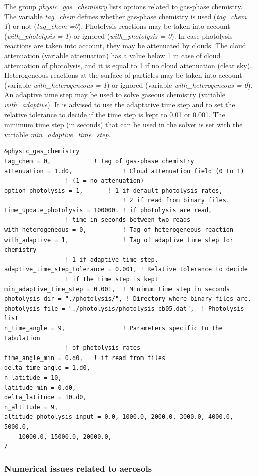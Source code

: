 \documentclass[a4paper,11pt]{article}
\begin{document}
The group {\textit{physic\_gas\_chemistry}} lists options related to gas-phase chemistry. 
The variable {\textit{tag\_chem}} defines whether gas-phase chemistry is used ({\textit{tag\_chem = 1}}) or not ({\textit{tag\_chem =0}}). 
Photolysis reactions may be taken into account ({\textit{with\_photolysis = 1}}) or ignored ({\textit{with\_photolysis = 0}}). In case photolysis reactions are taken into account, they may be attenuated by clouds. The cloud attenuation (variable attenuation) has a value below 1 in case of cloud attenuation of photolysis, and it is equal to 1 if no cloud attenuation (clear sky).
Heterogeneous reactions at the surface of particles may be taken into account (variable {\textit{with\_heterogeneous = 1}}) or ignored (variable {\textit{with\_heterogeneous = 0}}). An adaptive time step may be used to solve gaseous chemistry (variable {\textit{with\_adaptive}}). It is advised to use the adaptative time step and to set the relative tolerance to decide if the time step is kept to 0.01 or 0.001. The minimum time step (in seconds) that can be used in the solver is set with the variable {\textit{min\_adaptive\_time\_step}}.


\begin{verbatim}
&physic_gas_chemistry
tag_chem = 0,		   	 ! Tag of gas-phase chemistry
attenuation = 1.d0,              ! Cloud attenuation field (0 to 1)
				 ! (1 = no attenuation)
option_photolysis = 1,	 	 ! 1 if default photolysis rates, 
                                 ! 2 if read from binary files.
time_update_photolysis = 100000. ! if photolysis are read, 
				 ! time in seconds between two reads
with_heterogeneous = 0,          ! Tag of heterogeneous reaction 
with_adaptive = 1,               ! Tag of adaptive time step for chemistry 
				 ! 1 if adaptive time step.
adaptive_time_step_tolerance = 0.001, ! Relative tolerance to decide 
			 	 ! if the time step is kept
min_adaptive_time_step = 0.001,  ! Minimum time step in seconds
photolysis_dir = "./photolysis/", ! Directory where binary files are.
photolysis_file = "./photolysis/photolysis-cb05.dat",  ! Photolysis list
n_time_angle = 9,                ! Parameters specific to the tabulation 
			 	 ! of photolysis rates
time_angle_min = 0.d0,   ! if read from files
delta_time_angle = 1.d0,
n_latitude = 10,
latitude_min = 0.d0,
delta_latitude = 10.d0,
n_altitude = 9,
altitude_photolysis_input = 0.0, 1000.0, 2000.0, 3000.0, 4000.0, 5000.0, 
	10000.0, 15000.0, 20000.0, 
/
\end{verbatim}


\subsubsection{Numerical issues related to aerosols}
\end{document}
